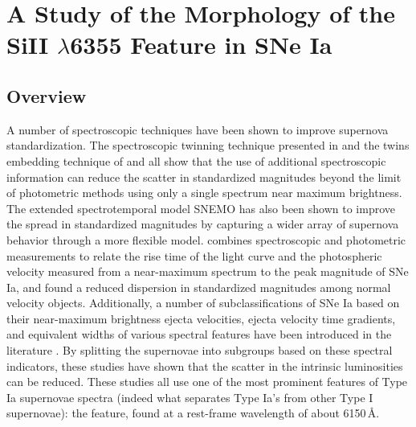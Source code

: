 \chapter{A Study of the Morphology of the SiII \texorpdfstring{$\lambda$}{}6355 Feature in SNe Ia}
\label{chap:si_feat_pca}

\section{Overview}
\label{intro}

A number of spectroscopic techniques have been shown to improve supernova standardization. The spectroscopic twinning technique presented in \citet{fakhouri_improving_2015} and the twins embedding technique of \citet{boone_twins_2020a} and \citet{boone_twins_2020b} all show that the use of additional spectroscopic information can reduce the scatter in standardized magnitudes beyond the limit of photometric methods using only a single spectrum near maximum brightness. The extended spectrotemporal model SNEMO \citep{saunders_snemo_2018} has also been shown to improve the spread in standardized magnitudes by capturing a wider array of supernova behavior through a more flexible model. \citet{zheng_empirical_2018} combines spectroscopic and photometric measurements to relate the rise time of the light curve and the photospheric velocity measured from a near-maximum spectrum to the peak magnitude of SNe Ia, and found a reduced dispersion in standardized magnitudes among normal velocity objects. Additionally, a number of subclassifications of SNe Ia based on their near-maximum brightness ejecta velocities, ejecta velocity time gradients, and equivalent widths of various spectral features have been introduced in the literature \citep{branch_comparative_2006, benetti_diversity_2005, wang_improved_2009, wang_evidence_2013}. By splitting the supernovae into subgroups based on these spectral indicators, these studies have shown that the scatter in the intrinsic luminosities can be reduced. These studies all use one of the most prominent features of Type Ia supernovae spectra (indeed what separates Type Ia's from other Type I supernovae): the \siliconii{} feature, found at a rest-frame wavelength of about 6150\,\AA. 

